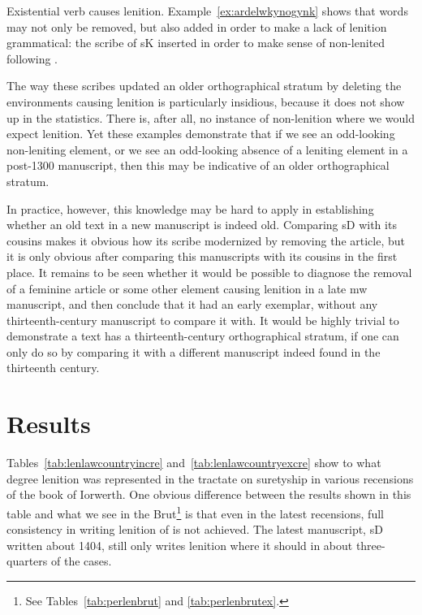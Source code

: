 \begin{mwl}
\end{mwl}
Existential verb  causes lenition. Example~\ref{ex:ardelwkynogynk} shows that words may not only be removed, but also added in order to make a lack of lenition grammatical: the scribe of \gls{sK} inserted  in order to make sense of non-lenited  following .

The way these scribes updated an older orthographical stratum by  deleting the environments causing lenition is particularly insidious, because it does not show up in the statistics. There is, after all, no instance of non-lenition where we would expect lenition. Yet these examples demonstrate that if we see an odd-looking non-leniting element, or we see an odd-looking absence of a leniting element in a post-1300 manuscript, then this may be indicative of an older orthographical stratum.

In practice, however, this knowledge may be hard to apply in establishing whether an old text in a new manuscript is indeed old. Comparing \gls{sD} with its cousins makes it obvious how its scribe modernized by removing the article, but it is only obvious after comparing this manuscripts with  its cousins in the first place. It remains to be seen whether it would be possible to diagnose the removal of a feminine article or some other element causing lenition in a late \gls{mw} manuscript, and then conclude that it had an early exemplar, without any thirteenth-century manuscript to compare it with. It would be highly trivial to demonstrate a text has a thirteenth-century orthographical stratum, if one can only do so by comparing it with a different manuscript indeed found in the thirteenth century.
\section{Results}
\label{sec:results}

Tables~\ref{tab:lenlawcountryincre} and~\ref{tab:lenlawcountryexcre} show to what degree lenition was represented in the tractate on suretyship in various recensions of the book of Iorwerth. One obvious difference between the results shown in this table and what we see in the Brut\footnote{See Tables~\ref{tab:perlenbrut} and \ref{tab:perlenbrutex}.} is that even in the latest recensions, full consistency in writing  lenition of  is not achieved. The latest manuscript, \gls{sD} written about 1404, still only writes lenition where it should in about three-quarters of the cases.

